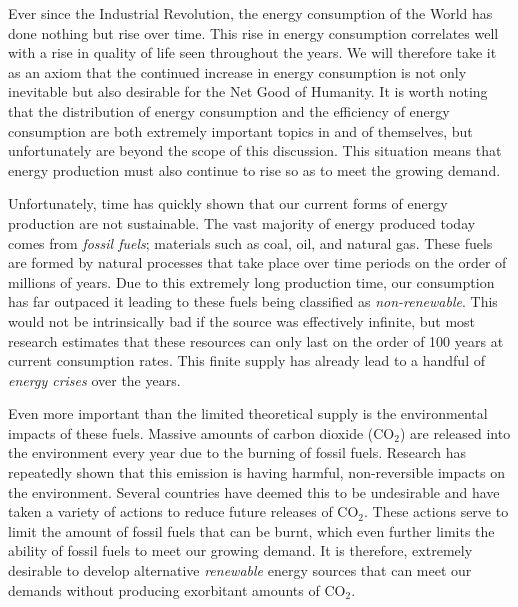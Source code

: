 	Ever since the Industrial Revolution, the energy consumption of the World has done nothing but rise over time. \cite{owidenergy} This rise in energy consumption correlates well with a rise in quality of life seen throughout the years. \cite{owidQoL} We will therefore take it as an axiom that the continued increase in energy consumption is not only inevitable but also desirable for the Net Good of Humanity. It is worth noting that the distribution of energy consumption and the efficiency of energy consumption are both extremely important topics in and of themselves, but unfortunately are beyond the scope of this discussion. This situation means that energy production must also continue to rise so as to meet the growing demand. \cite{freidberg_plasma_2007}
	
	Unfortunately, time has quickly shown that our current forms of energy production are not sustainable. \cite{owidfossilfuels} The vast majority of energy produced today comes from \emph{fossil fuels}; materials such as coal, oil, and natural gas. \cite{owidenergy} These fuels are formed by natural processes that take place over time periods on the order of millions of years. \cite{sato1990thermochemistry} Due to this extremely long production time, our consumption has far outpaced it leading to these fuels being classified as \emph{non-renewable}. This would not be intrinsically bad if the source was effectively infinite, but most research estimates that these resources can only last on the order of 100 years at current consumption rates. \cite{owidfossilfuels} This finite supply has already lead to a handful of \emph{energy crises} over the years. \cite{bibid}
	
	Even more important than the limited theoretical supply is the environmental impacts of these fuels. Massive amounts of carbon dioxide (CO$_2$) are released into the environment every year due to the burning of fossil fuels. \cite{owidfossilfuels} Research has repeatedly shown that this emission is having harmful, non-reversible impacts on the environment. \cite{ucsusa_fossilfuels, NASA_ClimateChange, stocker_climate_2014} Several countries have deemed this to be undesirable and have taken a variety of actions to reduce future releases of CO$_2$. \cite{paris_treaty} These actions serve to limit the amount of fossil fuels that can be burnt, which even further limits the ability of fossil fuels to meet our growing demand. It is therefore, extremely desirable to develop alternative \emph{renewable} energy sources that can meet our demands without producing exorbitant amounts of CO$_2$.
	
